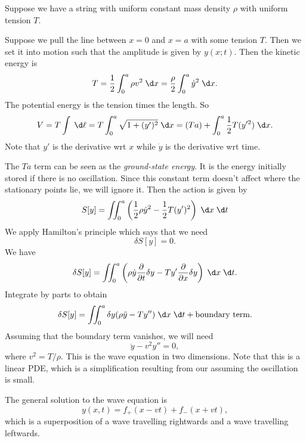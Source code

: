 \documentclass[a4paper]{article}
\begin{document}
\begin{eg}
  Suppose we have a string with uniform constant mass density $\rho$ with uniform tension $T$.
  \begin{center}
  \end{center}
  Suppose we pull the line between $x = 0$ and $x = a$ with some tension $T$. Then we set it into motion such that the amplitude is given by $y(x; t)$. Then the kinetic energy is
  \[
    T = \frac{1}{2}\int_0^a \rho v^2\;\d x = \frac{\rho}{2}\int_0^a \dot{y}^2 \;\d x.
  \]
  The potential energy is the tension times the length. So
  \[
    V = T\int \;\d \ell = T\int_0^a\sqrt{1 + (y')^2}\;\d x = (Ta) + \int_0^a \frac{1}{2}T(y'^2)\;\d x.
  \]
  Note that $y'$ is the derivative wrt $x$ while $\dot{y}$ is the derivative wrt time.

  The $Ta$ term can be seen as the \emph{ground-state energy}. It is the energy initially stored if there is no oscillation. Since this constant term doesn't affect where the stationary points lie, we will ignore it. Then the action is given by
  \[
    S[y] = \iint_0^a \left(\frac{1}{2}\rho \dot{y}^2 - \frac{1}{2}T(y')^2\right)\;\d x\;\d t
  \]
  We apply Hamilton's principle which says that we need
  \[
    \delta S[y] = 0.
  \]
  We have
  \[
    \delta S[y] = \iint_0^a \left(\rho \dot{y} \frac{\partial}{\partial t}\delta y - Ty' \frac{\partial}{\partial x}\delta y\right)\;\d x\;\d t.
  \]
  Integrate by parts to obtain
  \[
    \delta S[y] = \iint_0^a \delta y(\rho \ddot{y} - Ty'')\;\d x\;\d t + \text{boundary term}.
  \]
  Assuming that the boundary term vanishes, we will need
  \[
    \ddot{y} - v^2 y'' = 0,
  \]
  where $v^2 = T/\rho$. This is the wave equation in two dimensions. Note that this is a linear PDE, which is a simplification resulting from our assuming the oscillation is small.

  The general solution to the wave equation is
  \[
    y(x, t) = f_+(x - vt) + f_-(x + vt),
  \]
  which is a superposition of a wave travelling rightwards and a wave travelling leftwards.
\end{eg}
\end{document}
